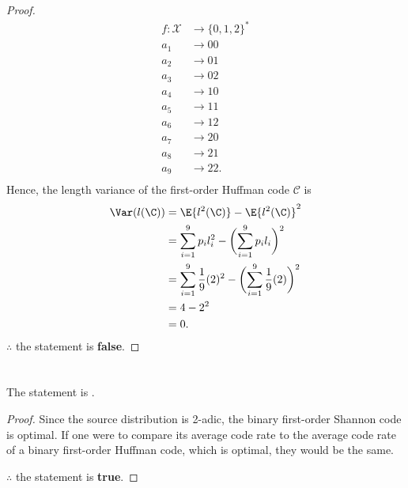 \documentclass[
  coursecode={MTHE 474},
  assignmentname={Homework \homeworknumber},
  studentnumber=20053722,
  name={Bryan Hoang},
  draft,
]{
  ltxanswer%
}
\begin{document}
\begin{questions}
\begin{parts}
\begin{solution}
\begin{proof}
          \begin{align*}
            f:\mathcal{X} &\to \{0,1,2\}^{*} \\
            a_{1}         &\to 00            \\
            a_{2}         &\to 01            \\
            a_{3}         &\to 02            \\
            a_{4}         &\to 10            \\
            a_{5}         &\to 11            \\
            a_{6}         &\to 12            \\
            a_{7}         &\to 20            \\
            a_{8}         &\to 21            \\
            a_{9}         &\to 22.           \\
          \end{align*}
          Hence, the length variance of the first-order Huffman code \(\mathcal{C}\) is
          \begin{align*}
            \Var(l(\C)) &= \E{l^{2}(\C)} - \E{l^{2}(\C)}^{2}                                                   \\
                        &= \sum_{i=1}^{9} p_{i}l_{i}^{2} - \biggl(\sum_{i=1}^{9} p_{i}l_{i}\biggr)^{2}         \\
                        &= \sum_{i=1}^{9} \frac{1}{9}(2)^{2} - \biggl(\sum_{i=1}^{9} \frac{1}{9}(2)\biggr)^{2} \\
                        &=  4 - 2^{2}                                                                          \\
                        &= 0.
          \end{align*}
          \(\therefore\) the statement is \textbf{false}.
        \end{proof}
      \end{solution}

      \part{}
      \begin{solution}
        \begin{claim}
          The statement is .
        \end{claim}
        \begin{proof}
          Since the source distribution is 2-adic, the binary first-order Shannon code is optimal. If one were to compare its average code rate to the average code rate of a binary first-order Huffman code, which is optimal, they would be the same.

          \(\therefore\) the statement is \textbf{true}.
        \end{proof}
      \end{solution}
    \end{parts}
  \end{questions}
\end{document}

